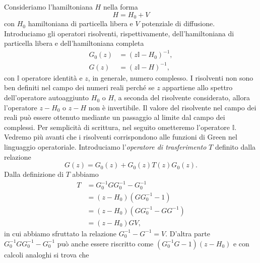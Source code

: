 \documentclass[a4paper,fleqn,twoside,12pt]{article}
\begin{document}
Consideriamo l'hamiltoniana $H$ nella forma
\begin{equation}
  H = H_{0} + V
\end{equation}
con $H_{0}$ hamiltoniana di particella libera e $V$ potenziale di diffusione.
Introduciamo gli operatori risolventi, rispettivamente, dell'hamiltoniana di
particella libera e dell'hamiltoniana completa
\begin{subequations}
  \begin{align}
    G_{0}(z) &= (z\mathbb{I} - H_{0})^{-1}, \\
    G(z) &= (z\mathbb{I} - H)^{-1},
  \end{align}
\end{subequations}
con $\mathbb{I}$ operatore identità e $z$, in generale, numero complesso.  I
risolventi non sono ben definiti nel campo dei numeri reali perché se $z$
appartiene allo spettro dell'operatore autoaggiunto $H_{0}$ o $H$, a seconda del
risolvente considerato, allora l'operatore $z - H_{0}$ o $z - H$ non è
invertibile.  Il valore del risolvente nel campo dei reali può essere ottenuto
mediante un passaggio al limite dal campo dei complessi.  Per semplicità di
scrittura, nel seguito ometteremo l'operatore $\mathbb{I}$.  Vedremo più avanti
che i risolventi corrispondono alle funzioni di Green nel linguaggio
operatoriale.  Introduciamo l'\emph{operatore di trasferimento} $T$ definito
dalla relazione
\begin{equation}
  \label{eq:oper-trasferimento}
  G(z) = G_{0}(z) + G_{0}(z) T(z) G_{0}(z).
\end{equation}
Dalla definizione di $T$ abbiamo
\begin{equation}
  \begin{split}
    T &= G_{0}^{-1} G G_{0}^{-1} - G_{0}^{-1} \\
    &= (z - H_{0})(GG_{0}^{-1} - 1) \\
    &= (z - H_{0})(GG_{0}^{-1} - GG^{-1}) \\
    &= (z - H_{0})GV,
  \end{split}
\end{equation}
in cui abbiamo sfruttato la relazione $G_{0}^{-1} - G^{-1} = V$.  D'altra parte
$G_{0}^{-1} G G_{0}^{-1} - G_{0}^{-1}$ può anche essere riscritto come
$(G_{0}^{-1}G - 1)(z - H_{0})$ e con calcoli analoghi si trova che
\end{document}
